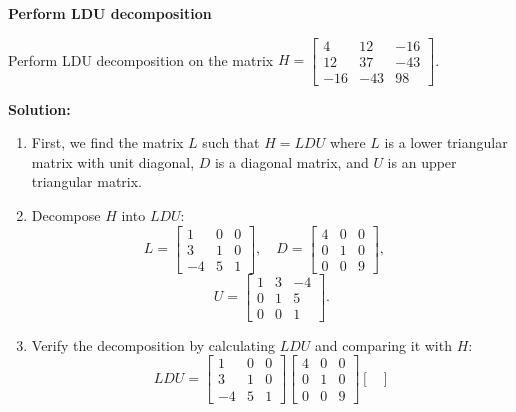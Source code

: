 \documentclass[8pt, a4paper, landscape]{extarticle}
\begin{document}
\begin{multicols*}{4}
  \columnbreak

  \textbf{Perform LDU decomposition}

  Perform LDU decomposition on the matrix $H = \begin{bmatrix} 4 & 12 & -16 \\ 12 & 37 & -43 \\ -16 & -43 & 98 \end{bmatrix}$.

  \textbf{Solution:}
  \begin{enumerate}
    \item First, we find the matrix $L$ such that $H = LDU$ where $L$ is a lower triangular matrix with unit diagonal, $D$ is a diagonal matrix, and $U$ is an upper triangular matrix.
    \item Decompose $H$ into $LDU$:
          \[
            L = \begin{bmatrix}
              1  & 0 & 0 \\
              3  & 1 & 0 \\
              -4 & 5 & 1
            \end{bmatrix}, \quad
            D = \begin{bmatrix}
              4 & 0 & 0 \\
              0 & 1 & 0 \\
              0 & 0 & 9
            \end{bmatrix}, \quad
          \]
          \[
            U = \begin{bmatrix}
              1 & 3 & -4 \\
              0 & 1 & 5  \\
              0 & 0 & 1
            \end{bmatrix}.
          \]
    \item Verify the decomposition by calculating $LDU$ and comparing it with $H$:
          \[
            LDU = \begin{bmatrix}
              1  & 0 & 0 \\
              3  & 1 & 0 \\
              -4 & 5 & 1
            \end{bmatrix}
            \begin{bmatrix}
              4 & 0 & 0 \\
              0 & 1 & 0 \\
              0 & 0 & 9
            \end{bmatrix}
            \begin{bmatrix}

\end{bmatrix}\]
\end{enumerate}
\end{multicols*}
\end{document}
